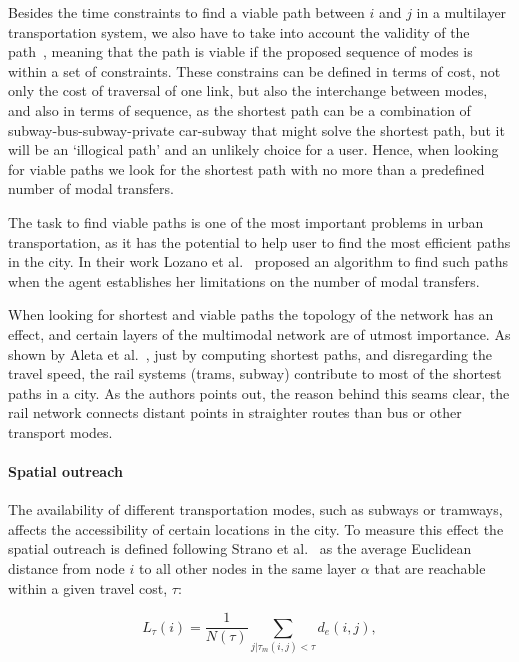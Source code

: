 Besides the time constraints to find a viable path between $i$ and $j$ in a multilayer transportation system, we also have to take into account the validity of the path~\cite{battista1996path, lozano2001path}, meaning that the path is viable if the proposed sequence of modes is within a set of constraints. These constrains can be defined in terms of cost, not only the cost of traversal of one link, but also the interchange between modes, and also in terms of sequence, as the shortest path can be a combination of subway-bus-subway-private car-subway that might solve the shortest path, but it will be an `illogical path' and an unlikely choice for a user. Hence, when looking for viable paths we look for the shortest path with no more than a predefined number of modal transfers.

The task to find viable paths is one of the most important problems in urban transportation, as it has the potential to help user to find the most efficient paths in the city. In their work Lozano et al.~\cite{lozano2001path} proposed an algorithm to find such paths when the agent establishes her limitations on the number of modal transfers.

When looking for shortest and viable paths the topology of the network has an effect, and certain layers of the multimodal network are of utmost importance. As shown by Aleta et al.~\cite{Aleta2017Multilayer}, just by computing shortest paths, and disregarding the travel speed, the rail systems (trams, subway) contribute to most of the shortest paths in a city. As the authors points out, the reason behind this seams clear, the rail network connects distant points in straighter routes than bus or other transport modes. 

\paragraph*{Spatial outreach}
The availability of different transportation modes, such as subways or tramways, affects the accessibility of certain locations in the city. To measure this effect the spatial outreach is defined following Strano et al.~\cite{strano2015features} as the average Euclidean distance from node $i$ to all other nodes in the same layer $\alpha$ that are reachable within a given travel cost, $\tau$:

\begin{equation}
    L_\tau(i)=\frac{1}{N(\tau)}\sum_{j|\tau_{m}(i,j)<\tau}d_e(i,j),
    \label{eq:outreach}
\end{equation}

